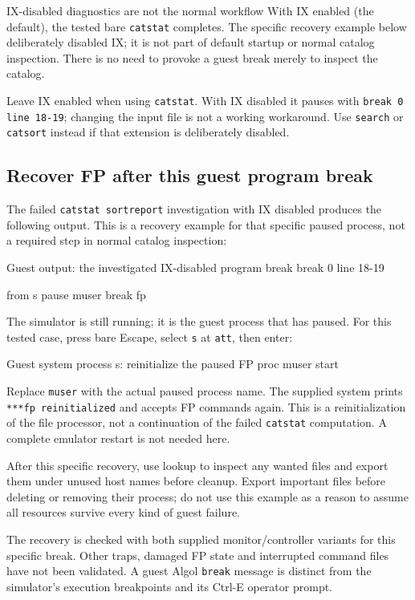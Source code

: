 \begin{operationnote}{IX-disabled diagnostics are not the normal workflow}
With IX enabled (the default), the tested bare \texttt{catstat} completes.
The specific recovery example below deliberately disabled IX; it is not
part of default startup or normal catalog inspection.
There is no need to provoke a guest break merely to inspect the catalog.
\end{operationnote}

Leave IX enabled when using \texttt{catstat}. With IX disabled it pauses with
\texttt{break 0 line 18-19}; changing the input file is not a working workaround.
Use \texttt{search} or \texttt{catsort} instead if that extension is deliberately
disabled.

\subsection{Recover FP after this guest program break}\label{recover-fp-after-this-guest-program-break}

The failed \passthrough{\lstinline!catstat sortreport!} investigation with
IX disabled produces the following output. This is a recovery example for
that specific paused process, not a required step in normal catalog inspection:

\begin{commandexample}{Guest output: the investigated IX-disabled program break}
break        0  line  18-19

from s
pause muser break fp
\end{commandexample}

The simulator is still running; it is the guest process that has paused. For this tested case, press bare Escape, select \passthrough{\lstinline!s!} at \passthrough{\lstinline!att!}, then enter:

\begin{commandexample}{Guest system process s: reinitialize the paused FP}
proc muser start
\end{commandexample}

Replace \passthrough{\lstinline!muser!} with the actual paused process name. The supplied system prints \passthrough{\lstinline!***fp reinitialized!} and accepts FP commands again. This is a reinitialization of the file processor, not a continuation of the failed \passthrough{\lstinline!catstat!} computation. A complete emulator restart is not needed here.

After this specific recovery, use lookup to inspect any wanted files and export them under unused host names before cleanup. Export important files before deleting or removing their process; do not use this example as a reason to assume all resources survive every kind of guest failure.

The recovery is checked with both supplied monitor/controller variants for this specific break. Other traps, damaged FP state and interrupted command files have not been validated. A guest Algol \passthrough{\lstinline!break!} message is distinct from the simulator's execution breakpoints and its Ctrl-E operator prompt.
